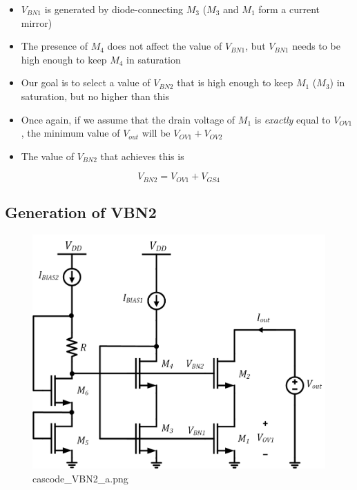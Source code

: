\documentclass[11pt]{article}
\begin{document}
    \begin{itemize}
\item
  \(V_{BN1}\) is generated by diode-connecting \(M_3\) (\(M_3\) and
  \(M_1\) form a current mirror)
\item
  The presence of \(M_4\) does not affect the value of \(V_{BN1}\), but
  \(V_{BN1}\) needs to be high enough to keep \(M_4\) in saturation
\item
  Our goal is to select a value of \(V_{BN2}\) that is high enough to
  keep \(M_1\) (\(M_3\)) in saturation, but no higher than this
\item
  Once again, if we assume that the drain voltage of \(M_1\) is
  \emph{exactly} equal to \(V_{OV1}\), the minimum value of \(V_{out}\)
  will be \(V_{OV1} + V_{OV2}\)
\item
  The value of \(V_{BN2}\) that achieves this is
\end{itemize}

\begin{equation}
V_{BN2} = V_{OV1} + V_{GS4}
\end{equation}

    \hypertarget{generation-of-vbn2}{%
\subsection{Generation of VBN2}\label{generation-of-vbn2}}

    \begin{figure}
\centering
\includegraphics{cascode_VBN2_a.png}
\caption{cascode\_VBN2\_a.png}
\end{figure}
\end{document}
